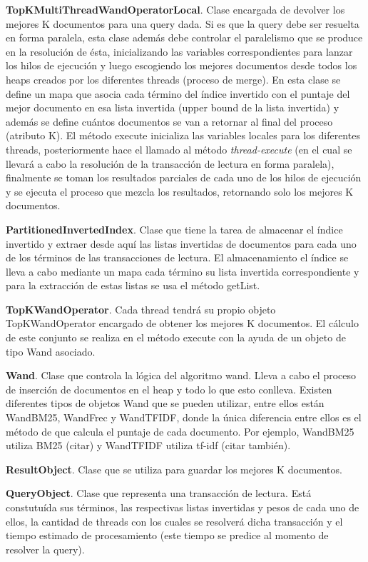 \begin{list}{}{}
	\item \textbf{TopKMultiThreadWandOperatorLocal}. Clase encargada de devolver los mejores K documentos para una query dada. Si es que la query debe ser resuelta en forma paralela, esta clase además debe controlar el paralelismo que se produce en la resolución de ésta, inicializando las variables correspondientes para lanzar los hilos de ejecución y luego escogiendo los mejores documentos desde todos los heaps creados por los diferentes threads (proceso de merge). En esta clase se define un mapa que asocia cada término del índice invertido con el puntaje del mejor documento en esa lista invertida (upper bound de la lista invertida) y además se define cuántos documentos se van a retornar al final del proceso (atributo K). El método execute inicializa las variables locales para los diferentes threads, posteriormente hace el llamado al método \emph{thread-execute} (en el cual se llevará a cabo la resolución de la transacción de lectura en forma paralela), finalmente se toman los resultados parciales de cada uno de los hilos de ejecución y se ejecuta el proceso que mezcla los resultados, retornando solo los mejores K documentos. 
	
	\item \textbf{PartitionedInvertedIndex}. Clase que tiene la tarea de almacenar el índice invertido y extraer desde aquí las listas invertidas de documentos para cada uno de los términos de las transacciones de lectura. El almacenamiento el índice se lleva a cabo mediante un mapa cada término su lista invertida correspondiente y para la extracción de estas listas se usa el método getList.
	
	\item \textbf{TopKWandOperator}.  Cada thread tendrá su propio objeto TopKWandOperator encargado de obtener los mejores K documentos. El cálculo de este conjunto se realiza en el método execute con la ayuda de un objeto de tipo Wand asociado.
	
	\item \textbf{Wand}. Clase que controla la lógica del algoritmo wand. Lleva a cabo el proceso de inserción de documentos en el heap y todo lo que esto conlleva. Existen diferentes tipos de objetos Wand que se pueden utilizar, entre ellos están WandBM25, WandFrec y WandTFIDF, donde la única diferencia entre ellos es el método de que calcula el puntaje de cada documento. Por ejemplo, WandBM25 utiliza BM25 (citar) y WandTFIDF utiliza tf-idf (citar también). 
	
	\item \textbf{ResultObject}. Clase que se utiliza para guardar los mejores K documentos.
	
	\item \textbf{QueryObject}. Clase que representa una transacción de lectura. Está constutuída sus términos,  las respectivas listas invertidas y pesos de cada uno de ellos, la cantidad de threads con los cuales se resolverá dicha transacción y el tiempo estimado de procesamiento (este tiempo se predice al momento de resolver la query).

\end{list}




